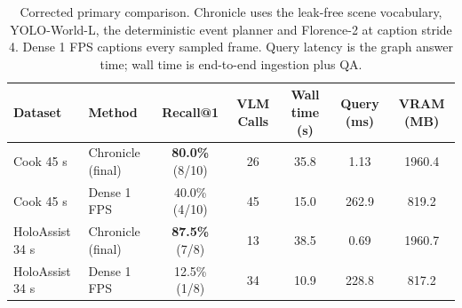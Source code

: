 \begin{table}[t]
  \centering
  \caption{Corrected primary comparison. Chronicle uses the leak-free scene
  vocabulary, YOLO-World-L, the deterministic event planner and Florence-2 at
  caption stride 4. Dense 1 FPS captions every sampled frame. Query latency is
  the graph answer time; wall time is end-to-end ingestion plus QA.}
  \label{tab:chronicle-vs-dense}
  \begin{tabular}{llccccc}
    \toprule
    Dataset & Method & Recall@1 & VLM Calls & Wall time (s) & Query (ms) & VRAM (MB) \\
    \midrule
    Cook 45 s & Chronicle (final) & \textbf{80.0\%} (8/10) & 26 & 35.8 & 1.13 & 1960.4 \\
    Cook 45 s & Dense 1 FPS & 40.0\% (4/10) & 45 & 15.0 & 262.9 & 819.2 \\
    \midrule
    HoloAssist 34 s & Chronicle (final) & \textbf{87.5\%} (7/8) & 13 & 38.5 & 0.69 & 1960.7 \\
    HoloAssist 34 s & Dense 1 FPS & 12.5\% (1/8) & 34 & 10.9 & 228.8 & 817.2 \\
    \bottomrule
  \end{tabular}
\end{table}
